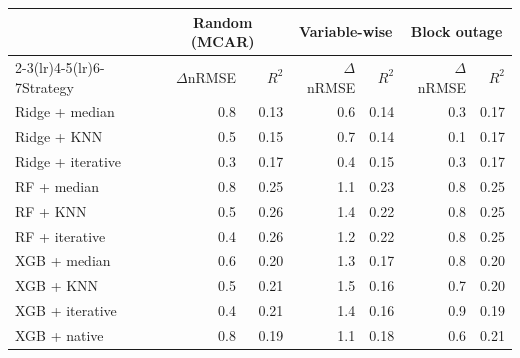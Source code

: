 \begin{tabular}{lrrrrrr}
\toprule
 & \multicolumn{2}{c}{Random (MCAR)} & \multicolumn{2}{c}{Variable-wise} & \multicolumn{2}{c}{Block outage} \\ \cmidrule(lr){2-3}\cmidrule(lr){4-5}\cmidrule(lr){6-7}Strategy & $\Delta$nRMSE & $R^2$ & $\Delta$nRMSE & $R^2$ & $\Delta$nRMSE & $R^2$ \\
\midrule
Ridge + median & 0.8 & 0.13 & 0.6 & 0.14 & 0.3 & 0.17 \\
Ridge + KNN & 0.5 & 0.15 & 0.7 & 0.14 & 0.1 & 0.17 \\
Ridge + iterative & 0.3 & 0.17 & 0.4 & 0.15 & 0.3 & 0.17 \\
RF + median & 0.8 & 0.25 & 1.1 & 0.23 & 0.8 & 0.25 \\
RF + KNN & 0.5 & 0.26 & 1.4 & 0.22 & 0.8 & 0.25 \\
RF + iterative & 0.4 & 0.26 & 1.2 & 0.22 & 0.8 & 0.25 \\
XGB + median & 0.6 & 0.20 & 1.3 & 0.17 & 0.8 & 0.20 \\
XGB + KNN & 0.5 & 0.21 & 1.5 & 0.16 & 0.7 & 0.20 \\
XGB + iterative & 0.4 & 0.21 & 1.4 & 0.16 & 0.9 & 0.19 \\
XGB + native & 0.8 & 0.19 & 1.1 & 0.18 & 0.6 & 0.21 \\
\bottomrule
\end{tabular}
